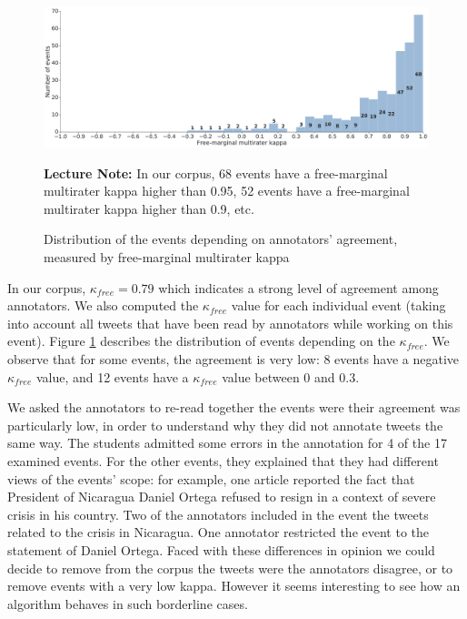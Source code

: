 \begin{figure}
\begin{center}
\includegraphics[width=1\textwidth]{figures/HistogramEventsDistributionByKappa.pdf}
\end{center}
{\scriptsize \textbf{Lecture Note:} In our corpus, 68 events have a free-marginal multirater kappa higher than 0.95, 52 events have a free-marginal multirater kappa higher than 0.9, etc.
}
\caption{Distribution of the events depending on annotators' agreement, measured by free-marginal multirater kappa}
\label{Figure:HistogramEventsByKappa}
\end{figure}

In our corpus, $\kappa_{free} = 0.79$ which indicates a strong level of agreement among annotators. We also computed the $\kappa_{free}$ value for  each individual event (taking into account all tweets that have been read by annotators while working on this event). Figure \ref{Figure:HistogramEventsByKappa} describes the distribution of events depending on the $\kappa_{free}$. We observe that for some events, the agreement is very low: 8 events have a negative $\kappa_{free}$ value, and 12 events have a $\kappa_{free}$ value between 0 and 0.3.


We asked the annotators to re-read together the events were their agreement was particularly low, in order to understand why they did not annotate tweets the same way. The students admitted some errors in the annotation for 4 of the 17 examined events. For the other events, they explained that they had different views of the events' scope: for example, one article reported the fact that President of Nicaragua Daniel Ortega refused to resign in a context of severe crisis in his country. Two of the annotators included in the event the tweets related to the crisis in Nicaragua. One annotator restricted the event to the statement of Daniel Ortega. Faced with these differences in opinion we could decide to remove from the corpus the tweets were the annotators disagree, or to remove events with a very low kappa. However it seems interesting to see how an algorithm behaves in such borderline cases.



